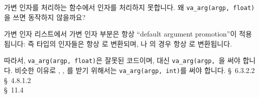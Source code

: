 \begin{faq}
	가변 인자를 처리하는 함수에서  인자를 처리하지 못합니다.
	왜 \verb+va_arg(argp, float)+을 쓰면 동작하지 않을까요?

\A
	가변 인자 리스트에서 가변 인자 부분은 항상 ``default argument
	promotion''이 적용됩니다: 즉  타입의 인자들은 항상
	로 변환되며, 나 의 경우
	항상 로 변환됩니다.  

        \noindent 따라서, \verb+va_arg(argp, float)+은
	잘못된 코드이며, 대신 \verb+va_arg(argp,+\ 을
        써야 합니다.
	비슷한 이유로 , , 를 받기 위해서는
	\verb+va_arg(argp, int)+를 써야 합니다.
\R
	\cite{c89} \S\ 6.3.2.2 \\
	\cite{rationale} \S\ 4.8.1.2 \\
	\cite{hs} \S\ 11.4 
\end{faq}

